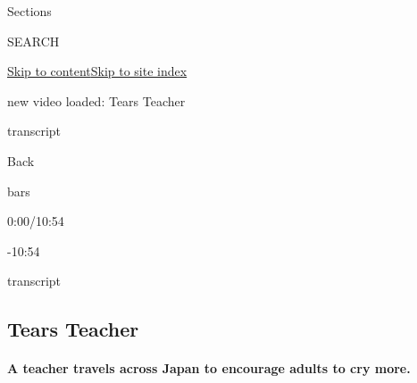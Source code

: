 Sections

SEARCH

\protect\hyperlink{site-content}{Skip to
content}\protect\hyperlink{site-index}{Skip to site index}

new video loaded: Tears Teacher

transcript

Back

bars

0:00/10:54

-10:54

transcript

\hypertarget{tears-teacher}{%
\subsection{Tears Teacher}\label{tears-teacher}}

\hypertarget{a-teacher-travels-across-japan-to-encourage-adults-to-cry-more}{%
\paragraph{A teacher travels across Japan to encourage adults to cry
more.}\label{a-teacher-travels-across-japan-to-encourage-adults-to-cry-more}}

